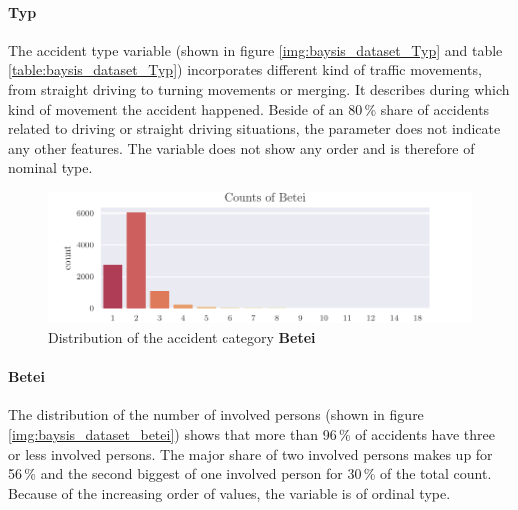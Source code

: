 \paragraph{Typ}
The accident type variable (shown in figure \autoref{img:baysis_dataset_Typ} and table \autoref{table:baysis_dataset_Typ}) incorporates different kind of traffic movements, from straight driving to turning movements or merging. It describes during which kind of movement the accident happened. Beside of an 80\,\% share of accidents related to driving or straight driving situations, the parameter does not indicate any other features. The variable does not show any order and is therefore of nominal type.

\begin{figure}[!ht]
	\centering
	\includegraphics[scale=1.0]{CorrAnalysis/data/BAYSIS/01_dataset/plots/baysis_dataset_count_Betei}
	\caption{Distribution of the accident category \textbf{Betei}}
	\label{img:baysis_dataset_betei}
\end{figure}
\paragraph{Betei}
The distribution of the number of involved persons (shown in figure \autoref{img:baysis_dataset_betei}) shows that more than 96\,\% of accidents have three or less involved persons. The major share of two involved persons makes up for 56\,\% and the second biggest of one involved person for 30\,\% of the total count. Because of the increasing order of values, the variable is of ordinal type.



